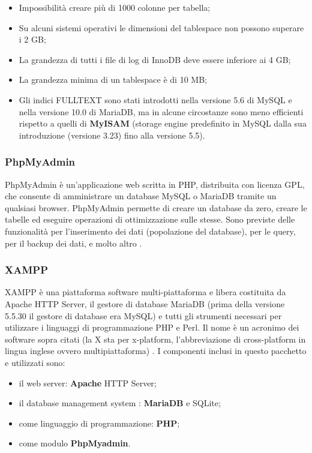 \begin{itemize}
\item Impossibilità creare più di 1000 colonne per tabella;
\item Su alcuni sistemi operativi le dimensioni del tablespace non possono superare i 2 GB;
\item La grandezza di tutti i file di log di InnoDB deve essere inferiore ai 4 GB;
\item	La grandezza minima di un tablespace è di 10 MB;
\item	Gli indici FULLTEXT sono stati introdotti nella versione 5.6 di MySQL e nella versione 10.0 di MariaDB, ma in alcune circostanze sono meno efficienti rispetto a quelli di \textbf{MyISAM} (storage engine predefinito in MySQL dalla sua introduzione (versione 3.23) fino alla versione 5.5).
\end{itemize}

\subsubsection{PhpMyAdmin}

PhpMyAdmin è un'applicazione web scritta in PHP, distribuita con licenza GPL, che consente di amministrare un database MySQL o MariaDB tramite un qualsiasi browser. 
\newline
PhpMyAdmin permette di creare un database da zero, creare le tabelle ed eseguire operazioni di ottimizzazione sulle stesse. Sono previste delle funzionalità per l'inserimento dei dati (popolazione del database), per le query, per il backup dei dati, e molto altro  \cite{sito_phpmyadmin}.
\newline


\subsubsection{XAMPP}
XAMPP è una piattaforma software multi-piattaforma e libera costituita da Apache HTTP Server, il gestore di database MariaDB (prima della versione 5.5.30 il gestore di database era MySQL)  e tutti gli strumenti necessari per utilizzare i linguaggi di programmazione PHP e Perl. Il nome è un acronimo dei software sopra citati (la X sta per x-platform, l'abbreviazione di cross-platform in lingua inglese ovvero multipiattaforma) \cite{sito_xampp}.
I componenti inclusi in questo pacchetto e utilizzati sono:
\begin{itemize}
\item il web server: \textbf{Apache} HTTP Server;
\item il database management system : \textbf{MariaDB} e SQLite; 
\item come linguaggio di programmazione: \textbf{PHP};
\item come modulo \textbf{PhpMyadmin}.
\end{itemize}


